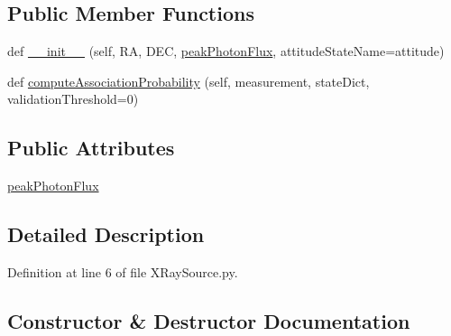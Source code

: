 \subsection*{Public Member Functions}
\begin{DoxyCompactItemize}
\item 
def \hyperlink{classmodest_1_1signals_1_1XRaySource_1_1__StaticXRayPointSource_a877ae4ee5f96057227798e8d94d99178}{\+\_\+\+\_\+init\+\_\+\+\_\+} (self, RA, D\+EC, \hyperlink{classmodest_1_1signals_1_1XRaySource_1_1__StaticXRayPointSource_a6e166745b77cf688aaeb474642bf3736}{peak\+Photon\+Flux}, attitude\+State\+Name=\textquotesingle{}attitude\textquotesingle{})
\item 
def \hyperlink{classmodest_1_1signals_1_1XRaySource_1_1__StaticXRayPointSource_adfb950fc03c2ef27b0e2c50c14b96ffc}{compute\+Association\+Probability} (self, measurement, state\+Dict, validation\+Threshold=0)
\end{DoxyCompactItemize}
\subsection*{Public Attributes}
\begin{DoxyCompactItemize}
\item 
\hyperlink{classmodest_1_1signals_1_1XRaySource_1_1__StaticXRayPointSource_a6e166745b77cf688aaeb474642bf3736}{peak\+Photon\+Flux}
\end{DoxyCompactItemize}


\subsection{Detailed Description}


Definition at line 6 of file X\+Ray\+Source.\+py.



\subsection{Constructor \& Destructor Documentation}
